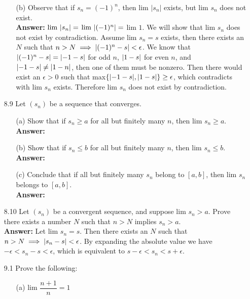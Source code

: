 \documentclass{article}
\begin{document}
\begin{itemize}
\begin{itemize}
\begin{itemize}
                        \end{itemize}
                  \item [(b)] Observe that if $s_n=(-1)^n$, then $\text{lim }|s_n|$ exists, but $\text{lim }s_n$ does not exist.\\
                        \textbf{Answer: } $\text{lim }\abs{s_n}=$ $\text{lim }\abs{(-1)^n}=$ $\text{lim }1$. We will show that $\text{lim }s_n$ does not exist by contradiction. Assume $\text{lim }s_n=s$ exists, then there exists an $N$ such that $n>N\implies\abs{(-1)^n-s}<\epsilon$. We know that $\abs{(-1)^n-s}=\abs{-1-s}$ for odd $n$, $\abs{1-s}$ for even $n$, and $\abs{-1-s}\neq\abs{1-n}$, then one of them must be nonzero. Then there would exist an $\epsilon>0$ such that max$\{\abs{-1-s},\abs{1-s}\}\geq\epsilon$, which contradicts with $\text{lim }s_n$ exists. Therefore $\text{lim }s_n$ does not exist by contradiction.
            \end{itemize}
      \item [8.9] Let $(s_n)$ be a sequence that converges.
            \begin{itemize}
                  \item [(a)] Show that if $s_n\geq a$ for all but finitely many $n$, then $\text{lim }s_n\geq a$.\\
                        \textbf{Answer: }
                  \item [(b)] Show that if $s_n\leq b$ for all but finitely many $n$, then $\text{lim }s_n\leq b$.\\
                        \textbf{Answer: }
                  \item [(c)] Conclude that if all but finitely many $s_n$ belong to $[a,b]$, then $\text{lim }s_n$ belongs to $[a,b]$.\\
                        \textbf{Answer: }
            \end{itemize}
      \item [8.10] Let $(s_n)$ be a convergent sequence, and suppose $\text{lim }s_n>a$. Prove there exists a number $N$ such that $n>N$ implies $s_n>a$.\\
            \textbf{Answer: } Let $\text{lim }s_n=s$. Then there exists an $N$ such that $n>N\implies\abs{s_n-s}<\epsilon$. By expanding the absolute value we have $-\epsilon<s_n-s<\epsilon$, which is equivalent to $s-\epsilon<s_n<s+\epsilon$.
      \item [9.1] Prove the following:
            \begin{itemize}
                  \item [(a)] $\text{lim }\dfrac{n+1}{n}=1$\\

\end{itemize}
\end{itemize}
\end{document}
